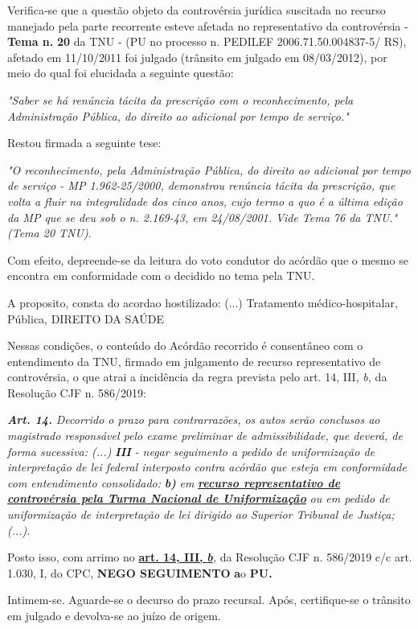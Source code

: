 \documentclass[12pt]{article}
\begin{document}
\justifying
\noindent Verifica-se que a questão objeto da controvérsia jurídica suscitada no recurso manejado pela parte recorrente esteve afetada no representativo da controvérsia - \textbf{Tema n. }\textbf{20} da TNU - (PU no processo n. PEDILEF 2006.71.50.004837-5/ RS),  afetado em 11/10/2011 foi julgado (trânsito em julgado em 08/03/2012), por meio do qual foi elucidada a seguinte questão:

\noindent \textit{"Saber se há renúncia tácita da prescrição com o reconhecimento, pela Administração Pública, do direito ao adicional por tempo de serviço."}

\noindent Restou firmada a seguinte tese:

\noindent \textit{"O reconhecimento, pela Administração Pública, do direito ao adicional por tempo de serviço - MP 1.962-25/2000, demonstrou renúncia tácita da prescrição, que volta a fluir na integralidade dos cinco anos, cujo termo a quo é a última edição da MP que se deu sob o n. 2.169-43, em 24/08/2001. Vide Tema 76 da TNU." (Tema 20 TNU).}

\noindent Com efeito, depreende-se da leitura do voto condutor do acórdão que o mesmo se encontra em conformidade com o decidido no  tema pela TNU.

\noindent A proposito, consta do acordao hostilizado: (...) Tratamento médico-hospitalar, Pública, DIREITO DA SAÚDE

\noindent Nessas condições, o conteúdo do Acórdão recorrido é consentâneo com o entendimento da TNU, firmado em julgamento de recurso representativo de controvérsia, o que atrai a incidência da regra prevista pelo art. 14, III, \textit{b,} da Resolução CJF n. 586/2019:

\noindent \textit{\textbf{Art. 14.}}\textit{ Decorrido o prazo para contrarrazões, os autos serão conclusos ao magistrado responsável pelo exame preliminar de admissibilidade, que deverá, de forma sucessiva: (...) }\textit{\textbf{III }}\textit{- negar seguimento a pedido de uniformização de interpretação de lei federal interposto contra acórdão que esteja em conformidade com entendimento consolidado: }\textit{\textbf{b)}}\textit{ em }\uline{\textit{\textbf{recurso representativo de controvérsia pela Turma Nacional de Uniformização}}}\textit{ ou em pedido de uniformização de interpretação de lei dirigido ao Superior Tribunal de Justiça;(...).}

\noindent Posto isso, com arrimo no \uline{\textbf{art. 14, III, }}\uline{\textit{\textbf{b}}}\textit{,} da Resolução CJF n. 586/2019 c/c art. 1.030, I, do CPC, \textbf{NEGO SEGUIMENTO }\textbf{a}o\textbf{ PU}\textbf{.}

\noindent Intimem-se. Aguarde-se o decurso do prazo recursal. Após, certifique-se o trânsito em julgado e devolva-se ao juízo de origem.
\end{document}
